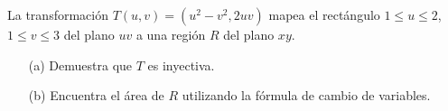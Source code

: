 La transformación \( T(u, v) = (u^2 - v^2, 2uv) \) mapea el rectángulo \( 1 \leq u \leq 2 \), \( 1 \leq v \leq 3 \) del plano \( uv \) a una región \( R \) del plano \( xy \).

\begin{enumerate}
    \item[(a)] Demuestra que \( T \) es inyectiva.
    \item[(b)] Encuentra el área de \( R \) utilizando la fórmula de cambio de variables.
\end{enumerate}
